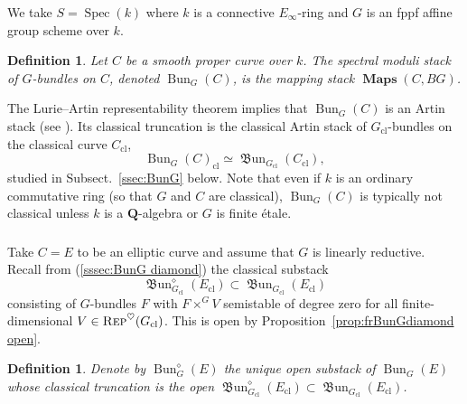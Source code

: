 \documentclass[12pt, oneside]{amsart}
\numberwithin{equation}{section}
\newtheorem{definition}[subsubsection]{Definition}
\theoremstyle{remark}
\theoremstyle{plain}
\newcommand{\Rep}{\textsc{Rep}}
\DeclareMathOperator{\MAP}{\mathbf{Maps}}
\DeclareMathOperator{\spc}{Spec}
\newcommand{\bQ}{\mathbf{Q}}
\newcommand{\cl}{{\operatorname{cl}}}
\newcommand{\Bun}{\operatorname{Bun}}
\newcommand{\frBun}{\operatorname{\mathfrak{B}un}}
\begin{document}
We take $S=\spc(k)$ where $k$ is a connective $E_\infty$-ring and $G$ is an fppf affine group scheme over $k$.

\begin{definition}
  Let $C$ be a smooth proper curve over $k$.
  The \emph{spectral moduli stack of $G$-bundles on $C$}, denoted $\operatorname{Bun}_G(C)$, is the mapping stack $\MAP(C, BG)$.
\end{definition}

The Lurie--Artin representability theorem implies that $\operatorname{Bun}_G(C)$ is an Artin stack (see \cite[Ch.~27]{SAG}).
Its classical truncation is the classical Artin stack of $G_\cl$-bundles on the classical curve $C_\cl$,
\[ \Bun_G(C)_\cl \simeq \frBun_{G_\cl}(C_\cl), \]
studied in Subsect.~\ref{ssec:BunG} below.
Note that even if $k$ is an ordinary commutative ring (so that $G$ and $C$ are classical), $\Bun_G(C)$ is typically not classical unless $k$ is a $\bQ$-algebra or $G$ is finite \'etale.

\subsubsection{}

Take $C=E$ to be an elliptic curve and assume that $G$ is linearly reductive.
Recall from (\ref{sssec:BunG diamond}) the classical substack
\[
  \frBun_{G_\cl}^\diamond(E_\cl)
  \subset \frBun_{G_\cl}(E_\cl)
\]
consisting of $G$-bundles $F$ with $F \times^G V$ semistable of degree zero for all finite-dimensional $V \in \Rep^{\heartsuit}(G_\cl)$.
This is open by Proposition~\ref{prop:frBunGdiamond open}.

\begin{definition}\label{def:BunG diamond}
  Denote by $\Bun_G^\diamond(E)$ the unique open substack of $
  \Bun_G(E)$ whose classical truncation is the open $\frBun_{G_\cl}^\diamond(E_\cl) \subset \frBun_{G_\cl}(E_\cl)$.
\end{definition}
\end{document}
